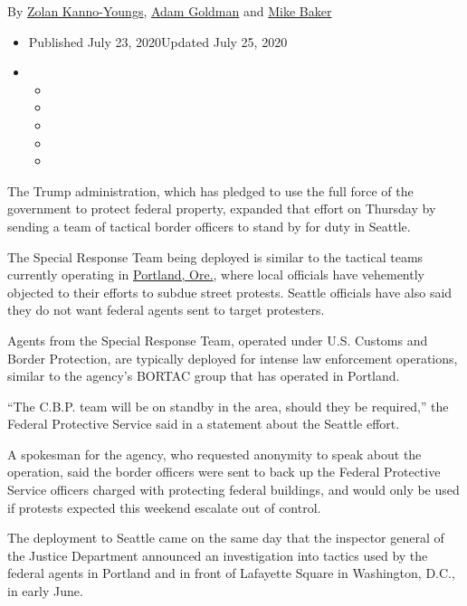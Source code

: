 By \href{https://www.nytimes.com/by/zolan-kanno-youngs}{Zolan
Kanno-Youngs}, \href{https://www.nytimes.com/by/adam-goldman}{Adam
Goldman} and \href{https://www.nytimes.com/by/mike-baker}{Mike Baker}

\begin{itemize}
\item
  Published July 23, 2020Updated July 25, 2020
\item
  \begin{itemize}
  \item
  \item
  \item
  \item
  \item
  \end{itemize}
\end{itemize}

The Trump administration, which has pledged to use the full force of the
government to protect federal property, expanded that effort on Thursday
by sending a team of tactical border officers to stand by for duty in
Seattle.

The Special Response Team being deployed is similar to the tactical
teams currently operating in
\href{https://www.nytimes.com/article/portland-protests-explained-protesters.html}{Portland,
Ore.}, where local officials have vehemently objected to their efforts
to subdue street protests. Seattle officials have also said they do not
want federal agents sent to target protesters.

Agents from the Special Response Team, operated under U.S. Customs and
Border Protection, are typically deployed for intense law enforcement
operations, similar to the agency's BORTAC group that has operated in
Portland.

``The C.B.P. team will be on standby in the area, should they be
required,'' the Federal Protective Service said in a statement about the
Seattle effort.

A spokesman for the agency, who requested anonymity to speak about the
operation, said the border officers were sent to back up the Federal
Protective Service officers charged with protecting federal buildings,
and would only be used if protests expected this weekend escalate out of
control.

The deployment to Seattle came on the same day that the inspector
general of the Justice Department announced an investigation into
tactics used by the federal agents in Portland and in front of Lafayette
Square in Washington, D.C., in early June.

